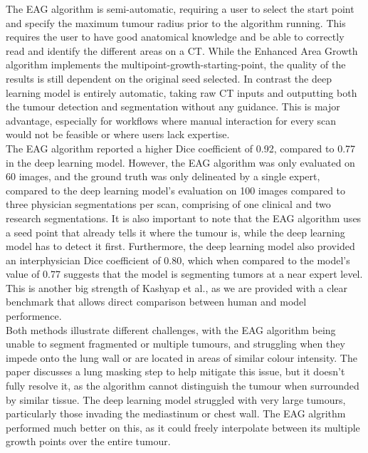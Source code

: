 \documentclass[11pt, a4paper]{article}
\begin{document}
\noindent The EAG algorithm is semi-automatic, requiring a user to select the start point and specify the maximum tumour radius prior to the algorithm running. 
This requires the user to have good anatomical knowledge and be able to correctly read and identify the different areas on a CT. 
While the Enhanced Area Growth algorithm implements the multipoint-growth-starting-point, the quality of the results is still dependent on the original seed selected. 
In contrast the deep learning model is entirely automatic, taking raw CT inputs and outputting both the tumour detection and segmentation without any guidance. 
This is major advantage, especially for workflows where manual interaction for every scan would not be feasible or where users lack expertise.\\

\noindent The EAG algorithm reported a higher Dice coefficient of 0.92, compared to 0.77 in the deep learning model. 
However, the EAG algorithm was only evaluated on 60 images, and the ground truth was only delineated by a single expert, compared to the deep learning model's evaluation on 100 images compared to three physician segmentations per scan, comprising of one clinical and two research segmentations. 
It is also important to note that the EAG algorithm uses a seed point that already tells it where the tumour is, while the deep learning model has to detect it first. 
Furthermore, the deep learning model also provided an interphysician Dice coefficient of 0.80, which when compared to the model's value of 0.77 suggests that the model is segmenting tumors at a near expert level. 
This is another big strength of Kashyap et al., as we are provided with a clear benchmark that allows direct comparison between human and model performence. \\

\noindent Both methods illustrate different challenges, with the EAG algorithm being unable to segment fragmented or multiple tumours, and struggling when they impede onto the lung wall or are located in areas of similar colour intensity. 
The paper discusses a lung masking step to help mitigate this issue, but it doesn't fully resolve it, as the algorithm cannot distinguish the tumour when surrounded by similar tissue. 
The deep learning model struggled with very large tumours, particularly those invading the mediastinum or chest wall.
The EAG algrithm performed much better on this, as it could freely interpolate between its multiple growth points over the entire tumour. \\
\end{document}
